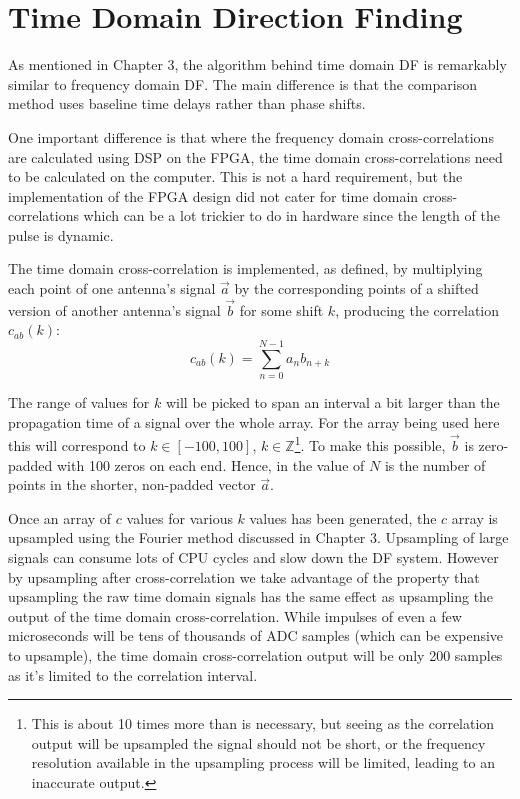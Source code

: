 \section{Time Domain Direction Finding}

As mentioned in Chapter 3, the algorithm behind time domain DF is remarkably similar to frequency domain DF. The main difference is that the comparison method uses baseline time delays rather than phase shifts. 

One important difference is that where the frequency domain cross-correlations are calculated using DSP on the FPGA, the time domain cross-correlations need to be calculated on the computer. This is not a hard requirement, but the implementation of the FPGA design did not cater for time domain cross-correlations which can be a lot trickier to do in hardware since the length of the pulse is dynamic.

The time domain cross-correlation is implemented, as defined, by multiplying each point of one antenna's signal \(\vec{a}\) by the corresponding points of a shifted version of another antenna's signal \(\vec{b}\) for some shift \(k\), producing the correlation \(c_{ab}(k)\):
\begin{equation} \label{eq:software:time-domain-cross-correlation}
  c_{ab}(k) = \sum_{n = 0}^{N-1} a_{n} b_{n+k}
\end{equation}

The range of values for \(k\) will be picked to span an interval a bit larger than the propagation time of a signal over the whole array. For the array being used here this will correspond to \(k\in [-100, 100]\), \(k\in \mathbb{Z}\)\footnote{This is about 10 times more than is necessary, but seeing as the correlation output will be upsampled the signal should not be short, or the frequency resolution available in the upsampling process will be limited, leading to an inaccurate output.}. To make this possible, \(\vec{b}\) is zero-padded with 100 zeros on each end. Hence, in  the value of \(N\) is the number of points in the shorter, non-padded vector \(\vec{a}\).

Once an array of \(c\) values for various \(k\) values has been generated, the \(c\) array is upsampled using the Fourier method discussed in Chapter 3.  Upsampling of large signals can consume lots of CPU cycles and slow down the DF system. However by upsampling after cross-correlation we take advantage of the property that upsampling the raw time domain signals has the same effect as upsampling the output of the time domain cross-correlation. While impulses of even a few microseconds will be tens of thousands of ADC samples (which can be expensive to upsample), the time domain cross-correlation output will be only 200 samples as it's limited to the correlation interval. 

